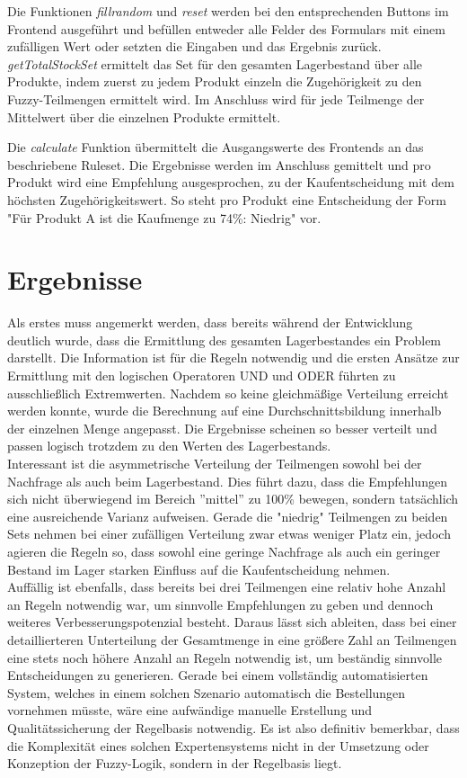 \documentclass[]{scrartcl}
\begin{document}
Die Funktionen \textit{fillrandom} und \textit{reset} werden bei den entsprechenden Buttons im Frontend ausgeführt und befüllen entweder alle Felder des Formulars mit einem zufälligen Wert oder setzten die Eingaben und das Ergebnis zurück. \textit{getTotalStockSet} ermittelt das Set für den gesamten Lagerbestand über alle Produkte, indem zuerst zu jedem Produkt einzeln die Zugehörigkeit zu den Fuzzy-Teilmengen ermittelt wird. Im Anschluss
wird für jede Teilmenge der Mittelwert über die einzelnen Produkte ermittelt.

Die \textit{calculate} Funktion übermittelt die Ausgangswerte des Frontends an das beschriebene Ruleset. Die Ergebnisse werden im Anschluss gemittelt und pro Produkt wird eine Empfehlung ausgesprochen, zu der Kaufentscheidung mit dem höchsten Zugehörigkeitswert. So steht pro Produkt eine Entscheidung der Form "Für Produkt A ist die Kaufmenge zu 74\%: Niedrig" vor.

\section{Ergebnisse}
\label{ergebnisse}
Als erstes muss angemerkt werden, dass bereits während der Entwicklung deutlich wurde, dass die Ermittlung des gesamten Lagerbestandes ein Problem darstellt. Die Information ist für die Regeln notwendig und die ersten Ansätze zur Ermittlung mit den logischen Operatoren UND und ODER führten zu ausschließlich Extremwerten. Nachdem so keine gleichmäßige Verteilung erreicht werden konnte, wurde die Berechnung auf eine Durchschnittsbildung innerhalb der einzelnen Menge angepasst. Die Ergebnisse  scheinen so besser verteilt und passen logisch trotzdem zu den Werten des Lagerbestands.
\\

Interessant ist die asymmetrische Verteilung der Teilmengen sowohl bei der Nachfrage als auch beim Lagerbestand. Dies führt dazu, dass die Empfehlungen sich nicht überwiegend im Bereich ''mittel'' zu 100\% bewegen, sondern tatsächlich eine ausreichende Varianz aufweisen. Gerade die "niedrig" Teilmengen zu beiden Sets nehmen bei einer zufälligen Verteilung zwar etwas weniger Platz ein, jedoch agieren die Regeln so, dass sowohl eine geringe Nachfrage als auch ein geringer Bestand im Lager starken Einfluss auf die Kaufentscheidung nehmen.
\\

Auffällig ist ebenfalls, dass bereits bei drei Teilmengen eine relativ hohe Anzahl an Regeln notwendig war, um sinnvolle Empfehlungen zu geben und dennoch weiteres Verbesserungspotenzial besteht. Daraus lässt sich ableiten, dass bei einer detaillierteren Unterteilung der Gesamtmenge in eine größere Zahl an Teilmengen eine stets noch höhere Anzahl an Regeln notwendig ist, um beständig sinnvolle Entscheidungen zu generieren. Gerade bei einem vollständig automatisierten System, welches in einem solchen Szenario automatisch die Bestellungen vornehmen müsste, wäre eine aufwändige manuelle Erstellung und Qualitätssicherung der Regelbasis notwendig. Es ist also definitiv bemerkbar, dass die Komplexität eines solchen Expertensystems nicht in der Umsetzung oder Konzeption der Fuzzy-Logik, sondern in der Regelbasis liegt. 
\end{document}
